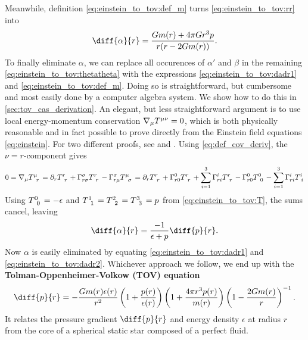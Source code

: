 Meanwhile, definition \eqref{eq:einstein_to_tov:def_m} turns \cref{eq:einstein_to_tov:rr} into
\begin{equation}
	\diff{\alpha}{r} = \frac{G m(r) + 4 \pi G r^3 p}{r (r - 2 G m(r))} .
	\label{eq:einstein_to_tov:dadr1}
\end{equation}
To finally eliminate $\alpha$, we can replace all occurences of $\alpha'$ and $\beta$ in the remaining \cref{eq:einstein_to_tov:thetatheta} with the expressions \eqref{eq:einstein_to_tov:dadr1} and \eqref{eq:einstein_to_tov:def_m}.
Doing so is straightforward, but cumbersome and most easily done by a computer algebra system.
We show how to do this in \cref{sec:tov_cas_derivation}.
An elegant, but less straightforward argument is to use local energy-momentum conservation $\nabla_\mu T\indices{^\mu^\nu} = 0$, which is both physically reasonable and in fact possible to prove directly from the Einstein field equations \eqref{eq:einstein}.
For two different proofs, see \cite{ref:einstein_conservation_energy_momentum} and \cite[section 8.3.2]{ref:mika_gr_notes}.
Using \cref{eq:def_cov_deriv}, the $\nu=r$-component gives
\begin{equation*}
	0
	= \nabla_\mu T\indices{^\mu_r}
	= \partial_r T\indices{^r_r} + \Gamma^\sigma_{r \sigma} T\indices{^r_r} - \Gamma^\sigma_{r \mu} T\indices{^\mu_\sigma}
	= \partial_r T\indices{^r_r} + \Gamma^0_{r0} T\indices{^r_r} + \sum_{i=1}^3 \Gamma^i_{ri} T\indices{^r_r} - \Gamma^0_{r0} T\indices{^0_0} - \sum_{i=1}^3 \Gamma^i_{ri} T\indices{^i_i}
\end{equation*}
Using $T\indices{^0_0} = -\epsilon$ and $T\indices{^1_1} = T\indices{^2_2} = T\indices{^3_3} = p$ from \cref{eq:einstein_to_tov:T}, the sums cancel, leaving
\begin{equation}
	\diff{\alpha}{r} = \frac{-1}{\epsilon+p} \diff{p}{r} .
	\label{eq:einstein_to_tov:dadr2}
\end{equation}
Now $\alpha$ is easily eliminated by equating \eqref{eq:einstein_to_tov:dadr1} and \eqref{eq:einstein_to_tov:dadr2}. 
Whichever approach we follow, we end up with the \textbf{Tolman-Oppenheimer-Volkow (TOV) equation}
\begin{equation}
	\diff{p}{r} = -\frac{G m(r) \epsilon(r)}{r^2} \left( 1 + \frac{p(r)}{\epsilon(r)} \right) \left( 1 + \frac{4 \pi r^3 p(r)}{m(r)} \right) \left( 1 - \frac{2 G m(r)}{r} \right)^{-1} .
	\label{eq:tov}
\end{equation}
It relates the pressure gradient $\diff{p}{r}$ and energy density $\epsilon$ at radius $r$ from the core of a spherical static star composed of a perfect fluid.
